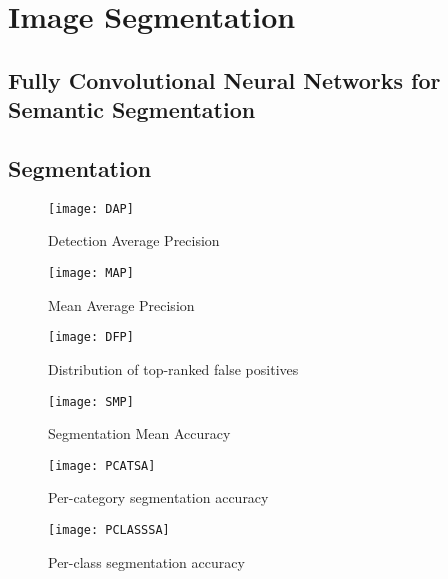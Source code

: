 \section{Image Segmentation}
\subsection*{Fully Convolutional Neural Networks for Semantic Segmentation}

\subsection*{Segmentation}


\begin{figure}
    \texttt{[image: DAP]}
    \caption{Detection Average Precision \parencite{donahue}}
    \label{fig:dap}
\end{figure}

\begin{figure}
    \texttt{[image: MAP]}
    \caption{Mean Average Precision \parencite{donahue}}
    \label{fig:MAP}
\end{figure}

\begin{figure}
    \texttt{[image: DFP]}
    \caption{Distribution of top-ranked false positives
    \parencite{donahue}}
    \label{fig:DFP}
\end{figure}

\begin{figure}
    \texttt{[image: SMP]}
    \caption{Segmentation Mean Accuracy \parencite{donahue}}
    \label{fig:SMP}
\end{figure}

\begin{figure}
    \texttt{[image: PCATSA]}
    \caption{Per-category segmentation accuracy \parencite{donahue}}
    \label{fig:PCATSA}
\end{figure}

\begin{figure}
    \texttt{[image: PCLASSSA]}
    \caption{Per-class segmentation accuracy \parencite{donahue}}
    \label{fig:PCLASSA}
\end{figure}

